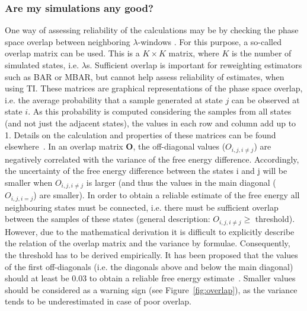 \documentclass[9pt,bestpractices]{livecoms}
\begin{document}
\subsubsection{Are my simulations any good?}
One way of assessing reliability of the calculations may be by checking the phase space overlap between neighboring $\lambda$-windows \cite{wu2005phasespace,wu2005phasespacea}. For this purpose, a so-called overlap matrix can be used. This is a $K\times K$ matrix, where $K$ is the number of simulated states, i.e. $\lambda$s. Sufficient overlap is important for reweighting estimators such as BAR or MBAR, but cannot help assess reliability of estimates, when using TI. 
These matrices are graphical representations of the phase space overlap, i.e. the average probability that a sample generated at state $j$ can be observed at state $i$. As this probability is computed considering the samples from all states (and not just the adjacent states), the values in each row and column add up to 1. Details on the calculation and properties of these matrices can be found elsewhere~\cite{klimovich2015guidelines}.
In an overlap matrix $\mathbf{O}$, the off-diagonal values (${O}_{i,j,i\ne j}$) are negatively correlated with the variance of the free energy difference. Accordingly, the uncertainty of the free energy difference between the states i and j will be smaller when ${O}_{i,j,i\ne j}$ is larger (and thus the values in the main diagonal (${O}_{i,j,i=j}$) are smaller). In order to obtain a reliable estimate of the free energy all neighbouring states must be connected, i.e. there must be sufficient overlap between the samples of these states (general description: ${O}_{i,j,i\ne j}\ge$ threshold).
However, due to the mathematical derivation it is difficult to explicitly describe the relation of the overlap matrix and the variance by formulae. Consequently, the threshold has to be derived empirically. It has been proposed that the values of the first off-diagonals (i.e. the diagonals above and below the main diagonal) should at least be 0.03 to obtain a reliable free energy estimate~\cite{klimovich2015guidelines}. Smaller values should be considered as a warning sign (see Figure~\ref{fig:overlap}), as the variance tends to be underestimated in case of poor overlap.
\end{document}
